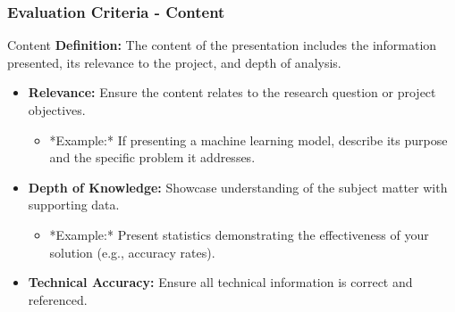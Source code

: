 \documentclass[aspectratio=169]{beamer}
\begin{document}
\begin{frame}[fragile]
  \frametitle{Evaluation Criteria - Content}
  \begin{block}{Content}
    \textbf{Definition:} The content of the presentation includes the information presented, its relevance to the project, and depth of analysis.
  
    \begin{itemize}
      \item \textbf{Relevance:} Ensure the content relates to the research question or project objectives.
            \begin{itemize}
              \item *Example:* If presenting a machine learning model, describe its purpose and the specific problem it addresses.
            \end{itemize}
      \item \textbf{Depth of Knowledge:} Showcase understanding of the subject matter with supporting data.
            \begin{itemize}
              \item *Example:* Present statistics demonstrating the effectiveness of your solution (e.g., accuracy rates).
            \end{itemize}
      \item \textbf{Technical Accuracy:} Ensure all technical information is correct and referenced.
    \end{itemize}
  \end{block}
\end{frame}
\end{document}
